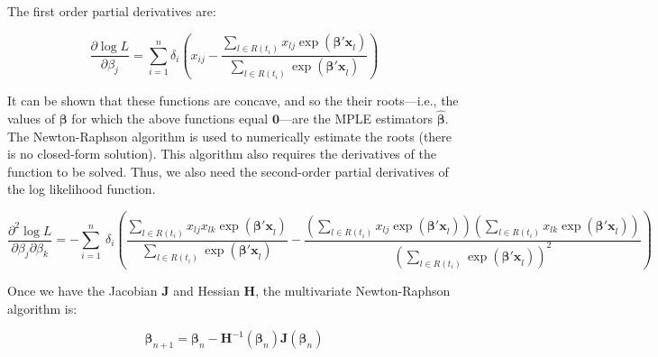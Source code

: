 \documentclass{article}
\begin{document}
\bigskip

The first order partial derivatives are:

\begin{equation}
\frac{\partial \log L}{\partial \beta_j} = 
	\sum_{i=1}^n 
	\delta_i
	\left( 
	x_{ij} - \frac{\sum_{l \in R(t_i)} x_{lj} \exp(\bm{\beta'x}_l)}
	{ \sum_{l \in R(t_i)} \exp(\bm{\beta'x}_l)}
	\right)
\end{equation}

It can be shown that these functions are concave, and so the their roots---i.e.,
the values of $\bm{\beta}$ for which the above functions equal $\bm{0}$---are the MPLE
estimators $\hat{\bm{\beta}}$. The Newton-Raphson algorithm is used to numerically
estimate the roots (there is no closed-form solution). This algorithm also
requires the derivatives of the function to be solved. Thus, we also need the
second-order partial derivatives of the log likelihood function.

\begin{equation}
\frac{\partial^2 \log L}{\partial \beta_j \partial \beta_k} = 
-
\sum_{i=1}^n \
\delta_i
	\left( 
	\frac{\sum_{l \in R(t_i)} x_{lj}x_{lk} \exp(\bm{\beta'x}_l)}
	{\sum_{l \in R(t_i)} \exp(\bm{\beta'x}_l)}
- 
\frac{
	\left(\sum_{l \in R(t_i)} x_{lj} \exp(\bm{\beta'x}_l)\right)
	\left(\sum_{l \in R(t_i)} x_{lk} \exp(\bm{\beta'x}_l)\right)
}
	{
		\left(
		\sum_{l \in R(t_i)} \exp(\bm{\beta'x}_l)
		\right)^2
		}
	\right)
\end{equation}

Once we have the Jacobian $\bm{J}$ and Hessian $\bm{H}$, the multivariate
Newton-Raphson algorithm is:

\begin{equation}
	\bm{\beta}_{n+1} = \bm{\beta}_n -
	\bm{H}^{-1}(\bm{\beta}_n)\bm{J}(\bm{\beta}_n)
\end{equation}
\end{document}
